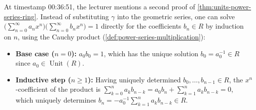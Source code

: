 \begin{aiNote}
At timestamp 00:36:51, the lecturer mentions a second proof of \cref{thm:units-power-series-ring}. Instead of substituting $\gamma$ into the geometric series, one can solve $\bigl(\sum_{n=0}^\infty a_n x^n\bigr)\bigl(\sum_{n=0}^\infty b_n x^n\bigr) = 1$ directly for the coefficients $b_n \in R$ by induction on $n$, using the Cauchy product (\cref{def:power-series-multiplication}):
\begin{itemize}
    \item \textbf{Base case ($n = 0$):} $a_0 b_0 = 1$, which has the unique solution $b_0 = a_0^{-1} \in R$ since $a_0 \in \operatorname{Unit}(R)$.
    \item \textbf{Inductive step ($n \ge 1$):} Having uniquely determined $b_0, \dots, b_{n-1} \in R$, the $x^n$-coefficient of the product is $\sum_{k=0}^n a_k b_{n-k} = a_0 b_n + \sum_{k=1}^n a_k b_{n-k} = 0$, which uniquely determines $b_n = -a_0^{-1} \sum_{k=1}^n a_k b_{n-k} \in R$.
\end{itemize}
\end{aiNote}

